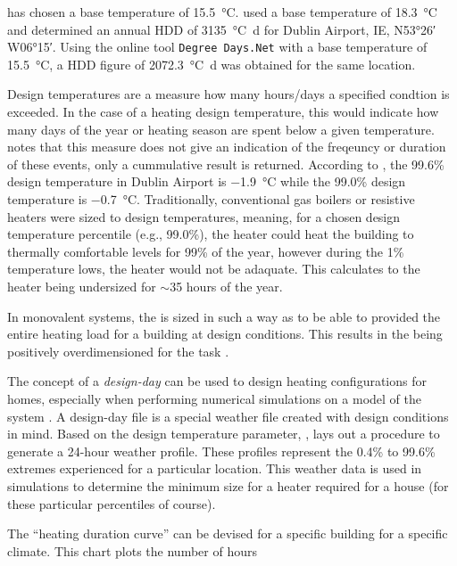  has chosen a base temperature of \SI{15.5}{\celsius}.  used a base temperature of \SI{18.3}{\celsius} and determined an annual \ac{HDD} of \SI{3135}{\celsius\day} for Dublin Airport, IE, N\ang{53;26;} W\ang{06;15;}. Using the online tool \texttt{Degree Days.Net} \cite{degreedays} with a base temperature of \SI{15.5}{\celsius}, a \ac{HDD} figure of \SI{2072.3}{\celsius\day} was obtained for the same location.  

Design temperatures are a measure how many hours/days a specified condtion is exceeded. In the case of a heating design temperature, this would indicate how many days of the year or heating season are spent below a given temperature.  notes that this measure does not give an indication of the freqeuncy or duration of these events, only a cummulative result is returned. According to , the 99.6\% design temperature in Dublin Airport is \SI{-1.9}{\celsius} while the 99.0\% design temperature is \SI{-0.7}{\celsius}. Traditionally, conventional gas boilers or resistive heaters were sized to design temperatures, meaning, for a chosen design temperature percentile (e.g., 99.0\%), the heater could heat the building to thermally comfortable levels for 99\% of the year, however during the 1\% temperature lows, the heater would not be adaquate. This calculates to the heater being undersized for $\sim$35 hours of the year. 

In monovalent systems, the \HP is sized in such a way as to be able to provided the entire heating load for a building at design conditions. This results in the \HP being positively overdimensioned for the task \cite{klein_numerical_2014}. 

The concept of a \textit{design-day} can be used to design heating configurations for homes, especially when performing numerical simulations on a model of the system \cite{rauschkolb_cost-optimal_2020}. A design-day file is a special weather file created with design conditions in mind. Based on the design temperature parameter, , lays out a procedure to generate a 24-hour weather profile. These profiles represent the 0.4\% to 99.6\% extremes experienced for a particular location. This weather data is used in simulations to determine the minimum size for a heater required for a house (for these particular percentiles of course). 

The ``heating duration curve'' can be devised for a specific building for a specific climate. This chart plots the number of hours 
